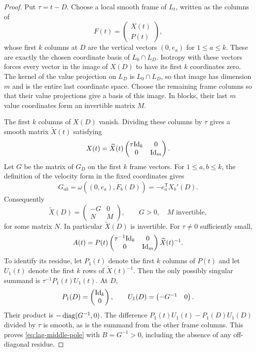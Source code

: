 \begin{proof}
Put $\tau=t-D$.  Choose a local smooth frame of $L_t$, written as the
columns of
\[
 F(t)=\begin{pmatrix}X(t)\\P(t)\end{pmatrix},
\]
whose first $k$ columns at $D$ are the vertical vectors $(0,e_a)$ for
$1\le a\le k$.  These are exactly the chosen coordinate basis of
$L_0\cap L_D$.  Isotropy with these vectors forces every vector in the
image of $X(D)$ to have its first $k$ coordinates zero.  The kernel of
the value projection on $L_D$ is $L_0\cap L_D$, so that image has
dimension $m$ and is the entire last coordinate space.  Choose the
remaining frame columns so that their value projections give a basis
of this image.  In blocks, their last $m$ value coordinates form an
invertible matrix $M$.

The first $k$ columns of $X(D)$ vanish.  Dividing these columns by
$\tau$ gives a smooth matrix $\widetilde X(t)$ satisfying
\[
 X(t)=\widetilde X(t)
 \begin{pmatrix}\tau\mathrm{Id}_k&0\\0&\mathrm{Id}_m\end{pmatrix}.
\]
Let $G$ be the matrix of $G_D$ on the first $k$ frame vectors.  For
$1\le a,b\le k$, the definition of the velocity form in the fixed
coordinates gives
\[
 G_{ab}=\omega((0,e_a),\dot F_b(D))
 =-e_a^{\mathsf T}X_b'(D).
\]
Consequently
\begin{equation}
 \widetilde X(D)=
 \begin{pmatrix}-G&0\\N&M\end{pmatrix},
 \qquad G>0,\quad M\text{ invertible},
 \label{eq:lag-divided-frame}
\end{equation}
for some matrix $N$.  In particular $\widetilde X(D)$ is invertible.
For $\tau\ne0$ sufficiently small,
\[
 A(t)=P(t)
 \begin{pmatrix}\tau^{-1}\mathrm{Id}_k&0\\0&\mathrm{Id}_m\end{pmatrix}
 \widetilde X(t)^{-1}.
\]
To identify its residue, let $P_1(t)$ denote the first $k$ columns of
$P(t)$ and let $U_1(t)$ denote the first $k$ rows of
$\widetilde X(t)^{-1}$.  Then the only possibly singular summand is
$\tau^{-1}P_1(t)U_1(t)$.  At $D$,
\[
 P_1(D)=\begin{pmatrix}\mathrm{Id}_k\\0\end{pmatrix},
 \qquad U_1(D)=\begin{pmatrix}-G^{-1}&0\end{pmatrix}.
\]
Their product is $-\operatorname{diag}(G^{-1},0)$.  The difference
$P_1(t)U_1(t)-P_1(D)U_1(D)$ divided by $\tau$ is smooth, as is the
summand from the other frame columns.  This proves
\eqref{eq:lag-middle-pole} with $B=G^{-1}>0$, including the absence of
any off-diagonal residue.


\end{proof}
